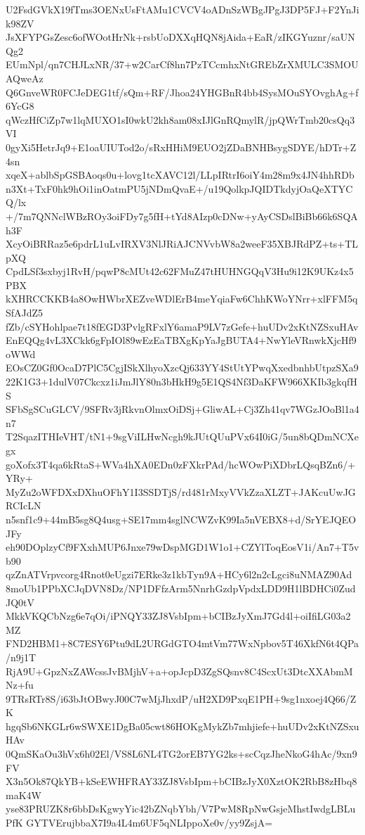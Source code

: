 U2FsdGVkX19fTms3OENxUsFtAMu1CVCV4oADnSzWBgJPgJ3DP5FJ+F2YnJik98ZV
JsXFYPGsZesc6ofWOotHrNk+rsbUoDXXqHQN8jAida+EaR/zIKGYuznr/saUNQg2
EUmNpl/qn7CHJLxNR/37+w2CarCf8hn7PzTCcmhxNtGREbZrXMULC3SMOUAQweAz
Q6GnveWR0FCJeDEG1tf/sQm+RF/Jhoa24YHGBnR4bb4SysMOuSYOvghAg+f6YcG8
qWczHfCiZp7w1lqMUXO1sI0wkU2kh8am08xIJlGnRQmylR/jpQWrTmb20csQq3VI
0gyXi5HetrJq9+E1oaUIUTod2o/sRxHHiM9EUO2jZDaBNHBsygSDYE/hDTr+Z4sn
xqeX+ablbSpGSBAoqs0u+lovg1tcXAVC12l/LLpIRtrI6oiY4m28m9x4JN4hhRDb
n3Xt+TxF0hk9hOi1inOatmPU5jNDmQvaE+/u19QolkpJQIDTkdyjOaQeXTYCQ/lx
+/7m7QNNclWBzROy3oiFDy7g5fH+tYd8AIzp0cDNw+yAyCSDslBiBb66k6SQAh3F
XcyOiBRRaz5e6pdrL1uLvIRXV3NlJRiAJCNVvbW8a2weeF35XBJRdPZ+ts+TLpXQ
CpdLSf3sxbyj1RvH/pqwP8cMUt42c62FMuZ47tHUHNGQqV3Hu9i12K9UKz4x5PBX
kXHRCCKKB4a8OwHWbrXEZveWDlErB4meYqiaFw6ChhKWoYNrr+xlFFM5qSfAJdZ5
fZb/cSYHohlpae7t18fEGD3PvlgRFxlY6amaP9LV7zGefe+huUDv2xKtNZSxuHAv
EnEQQg4vL3XCkk6gFpIOl89wEzEaTBXgKpYaJgBUTA4+NwYleVRnwkXjcHf9oWWd
EOsCZ0Gf0OcaD7PlC5CgjISkXlhyoXzcQj633YY4StUtYPwqXxedbnhbUtpzSXa9
22K1G3+1dulV07Ckcxz1iJmJlY80n3bHkH9g5E1QS4Nf3DaKFW966XKIb3gkqfHS
SFbSgSCuGLCV/9SFRv3jRkvnOlmxOiDSj+GliwAL+Cj3Zh41qv7WGzJOoBl1a4n7
T2SqazITHIeVHT/tN1+9sgViILHwNcgh9kJUtQUuPVx64I0iG/5un8bQDmNCXegx
goXofx3T4qa6kRtaS+WVa4hXA0EDn0zFXkrPAd/hcWOwPiXDbrLQsqBZn6/+YRy+
MyZu2oWFDXxDXhuOFhY1I3SSDTjS/rd481rMxyVVkZzaXLZT+JAKcuUwJGRCIcLN
n5snf1c9+44mB5sg8Q4usg+SE17mm4sglNCWZvK99Ia5nVEBX8+d/SrYEJQEOJFy
eh90DOplzyCf9FXxhMUP6Jnxe79wDspMGD1W1o1+CZYlToqEosV1i/An7+T5vb90
qzZnATVrpvcorg4Rnot0eUgzi7ERke3z1kbTyn9A+HCy6l2n2cLgci8uNMAZ90Ad
8moUb1PPbXCJqDVN8Dz/NP1DFfzArm5NnrhGzdpVpdxLDD9H1lBDHCi0ZudJQ0tV
MkkVKQCbNzg6e7qOi/iPNQY33ZJ8VsbIpm+bCIBzJyXmJ7Gd4l+oiIfiLG03a2MZ
FND2HBM1+8C7ESY6Ptu9dL2URGdGTO4mtVm77WxNpbov5T46XkfN6t4QPa/n9j1T
RjA9U+GpzNxZAWcssJvBMjhV+a+opJcpD3ZgSQsnv8C4ScxUt3DtcXXAbmMNz+fu
9TRsRTr8S/i63bJtOBwyJ00C7wMjJhxdP/uH2XD9PxqE1PH+9sg1nxoej4Q66/ZK
hgqSb6NKGLr6wSWXE1DgBa05cwt86HOKgMykZb7mhjiefe+huUDv2xKtNZSxuHAv
0QmSKaOu3hVx6h02El/VS8L6NL4TG2orEB7YG2ks+scCqzJheNkoG4hAc/9xn9FV
X3n5Ok87QkYB+kSeEWHFRAY33ZJ8VsbIpm+bCIBzJyX0XztOK2RbB8zHbq8maK4W
yse83PRUZK8r6bbDsKgwyYic42bZNqbYbh/V7PwM8RpNwGsjeMhstIwdgLBLuPfK
GYTVErujbbaX7I9a4L4m6UF5qNLIppoXe0v/yy9ZsjA=
